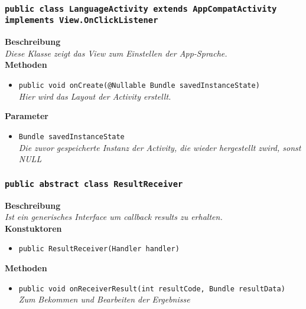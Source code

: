 \documentclass[a4paper]{scrreprt}
\begin{document}
       \subsubsection{\texttt{public class LanguageActivity extends AppCompatActivity implements View.OnClickListener}}
               
               	\textbf{Beschreibung} \\
      	        \textit{Diese Klasse zeigt das View zum Einstellen der App-Sprache.} \\
                
                \textbf{Methoden}
                \begin{itemize}
        		\item\texttt{{public void onCreate(@Nullable Bundle savedInstanceState)}}\\
                \textit{Hier wird das Layout der Activity erstellt.}\\
                \end{itemize}
                
                \textbf{Parameter}
                \begin{itemize}
        		\item\texttt{Bundle savedInstanceState}\\  
                \textit{Die zuvor gespeicherte Instanz der Activity, die wieder hergestellt zwird, sonst NULL}\\
                \end{itemize} 
        
        \subsubsection{\texttt{public abstract class ResultReceiver}}
               
               	\textbf{Beschreibung} \\
      	        \textit{Ist ein generisches Interface um callback results zu erhalten.} \\
               
             	\textbf{Konstuktoren}
                \begin{itemize}
        		\item\texttt{{public ResultReceiver(Handler handler)}}\\
                \end{itemize}
               
                \textbf{Methoden}
                \begin{itemize}
        		\item\texttt{{public void onReceiverResult(int resultCode, Bundle resultData)}}\\
                \textit{Zum Bekommen und Bearbeiten der Ergebnisse}\\
                \end{itemize}
                
\end{document}
